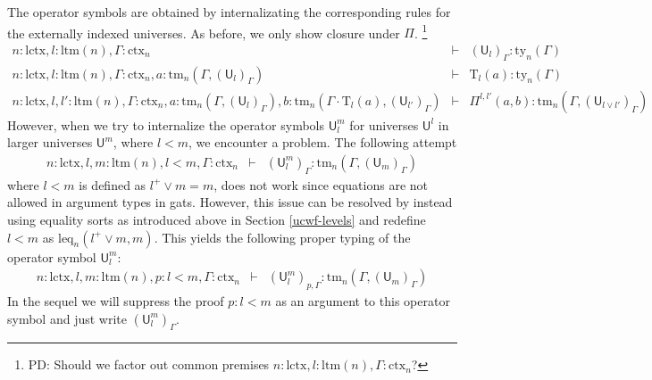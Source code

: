 \documentclass[11pt,a4paper]{article}
\theoremstyle{plain}
\theoremstyle{definition}
\newcommand{\UU}{\mathsf{U}}
\def\UU{\mathsf{U}}
\newcommand{\N}{\mathsf{N}}
\def\Pihat{\Pi}
\def\lctx{\mathrm{lctx}}
\def\ltm{\mathrm{ltm}}
\def\leq{\mathrm{leq}}
\newcommand{\ctx}{\mathrm{ctx}}
\newcommand{\ty}{\mathrm{ty}}
\newcommand{\tm}{\mathrm{tm}}
\def\U{\mathsf{U}}
\newcommand{\Ta}{\mathrm{T}}
\begin{document}
The operator symbols are obtained by internalizating the corresponding rules for the externally indexed universes. As before, we only show closure under $\Pi$. \footnote{PD: Should we factor out common premises $n : \lctx, l : \ltm(n), \Gamma : \ctx_n$?}
\begin{eqnarray*}
n : \lctx, l : \ltm(n), \Gamma : \ctx_n &\vdash& (\U_{l})_\Gamma : \ty_n(\Gamma)\\
n : \lctx, l : \ltm(n), \Gamma : \ctx_n, a : \tm_n(\Gamma,(\U_{l})_\Gamma) &\vdash& {\Ta_{l}}(a) : \ty_n(\Gamma)\\
n : \lctx, l, l' : \ltm(n), \Gamma : \ctx_n,
a : \tm_n(\Gamma,(\U_{l})_\Gamma),
b :  \tm_n(\Gamma \cdot \Ta_{l}(a), (\U_{l'})_\Gamma)
&\vdash&
 \Pihat^{l,l'}(a,b) : \tm_n(\Gamma,(\U_{l \vee l'})_\Gamma)
\end{eqnarray*}
However, when we try to internalize the operator symbols $\UU^m_l$ for universes $\UU^l$ in larger universes $\UU^m$, where $l < m$, we encounter a problem. The following attempt
\begin{eqnarray*}
n : \lctx, l, m : \ltm(n), l < m, \Gamma : \ctx_n&\vdash&(\UU^m_l)_\Gamma: \tm_n(\Gamma,(\UU_{m})_\Gamma)
\end{eqnarray*}
where $l < m$ is defined as $l^+ \vee m = m$, does not work since equations are not allowed in argument types in gats.
However, this issue can be resolved by instead using equality sorts as introduced above in Section
\ref{ucwf-levels} and redefine $l < m$ as $\leq_n(l^+ \vee m, m)$. This yields the following proper typing of the operator symbol $\UU^m_l$:
\begin{eqnarray*}
n : \lctx, l, m : \ltm(n), p : l < m, \Gamma : \ctx_n&\vdash&(\UU^m_l)_{p,\Gamma} : \tm_n(\Gamma,(\UU_{m})_\Gamma)
\end{eqnarray*}
In the sequel we will suppress the proof $p : l < m$ as an argument to this operator symbol and just write $(\UU^m_l)_{\Gamma}$.
\end{document}
